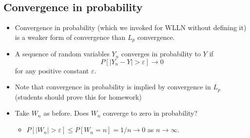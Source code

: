 \subsection{Convergence in probability}
\begin{itemize}
\item Convergence in probability (which we invoked for WLLN without
       defining it) is a weaker form of convergence than $L_p$
       convergence.
\item A sequence of random variables $Y_n$ converges in probability to
       $Y$ if \[ P[\lvert Y_n - Y \rvert > \varepsilon] \to 0 \] for
       any positive constant $\varepsilon$.
\item Note that convergence in probability is implied by convergence
       in $L_p$ (students should prove this for homework)
\item Take $W_n$ as before.  Does $W_n$ converge to zero in probability?
\begin{itemize}
\item $P[\lvert W_n \rvert > \varepsilon] \leq P[W_n = n] = 1/n \to
         0$ as $n \to \infty$.
\end{itemize}
\end{itemize}

